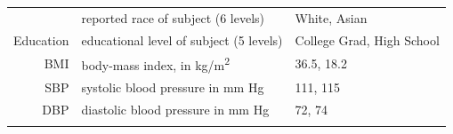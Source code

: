 \documentclass[
]{book}
\begin{document}
\begin{longtable}[]{@{}rll@{}}
\begin{minipage}[t]{0.15\columnwidth}
\end{minipage} & \begin{minipage}[t]{0.58\columnwidth}\raggedright
reported race of subject (6 levels)\strut
\end{minipage} & \begin{minipage}[t]{0.18\columnwidth}\raggedright
White, Asian\strut
\end{minipage}\tabularnewline
\begin{minipage}[t]{0.15\columnwidth}\raggedleft
Education\strut
\end{minipage} & \begin{minipage}[t]{0.58\columnwidth}\raggedright
educational level of subject (5 levels)\strut
\end{minipage} & \begin{minipage}[t]{0.18\columnwidth}\raggedright
College Grad, High School\strut
\end{minipage}\tabularnewline
\begin{minipage}[t]{0.15\columnwidth}\raggedleft
BMI\strut
\end{minipage} & \begin{minipage}[t]{0.58\columnwidth}\raggedright
body-mass index, in kg/m\textsuperscript{2}\strut
\end{minipage} & \begin{minipage}[t]{0.18\columnwidth}\raggedright
36.5, 18.2\strut
\end{minipage}\tabularnewline
\begin{minipage}[t]{0.15\columnwidth}\raggedleft
SBP\strut
\end{minipage} & \begin{minipage}[t]{0.58\columnwidth}\raggedright
systolic blood pressure in mm Hg\strut
\end{minipage} & \begin{minipage}[t]{0.18\columnwidth}\raggedright
111, 115\strut
\end{minipage}\tabularnewline
\begin{minipage}[t]{0.15\columnwidth}\raggedleft
DBP\strut
\end{minipage} & \begin{minipage}[t]{0.58\columnwidth}\raggedright
diastolic blood pressure in mm Hg\strut
\end{minipage} & \begin{minipage}[t]{0.18\columnwidth}\raggedright
72, 74\strut
\end{minipage}\tabularnewline
\begin{minipage}[t]{0.15\columnwidth}\raggedleft

\end{minipage}
\end{longtable}
\end{document}

